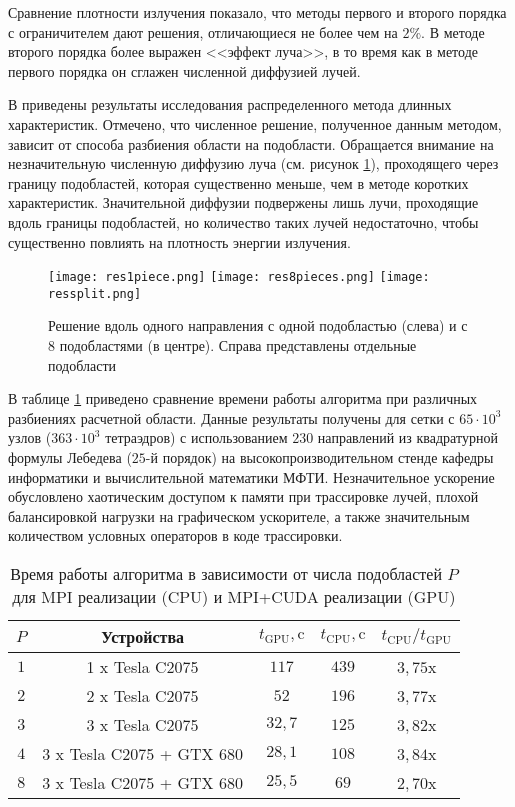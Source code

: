Сравнение плотности излучения показало, что методы первого и второго порядка с ограничителем дают решения, отличающиеся не более чем на $2\%$. В методе второго порядка более выражен <<эффект луча>>, в то время как в методе первого порядка он сглажен численной диффузией лучей.

В  приведены результаты исследования распределенного метода длинных характеристик. Отмечено, что численное решение, полученное данным методом, зависит от способа разбиения области на подобласти. Обращается внимание на незначительную численную диффузию луча (см. рисунок \ref{fig:1vs8}), проходящего через границу подобластей, которая существенно меньше, чем в методе коротких характеристик. Значительной диффузии подвержены лишь лучи, проходящие вдоль границы подобластей, но количество таких лучей недостаточно, чтобы существенно повлиять на плотность энергии излучения.
\begin{figure}[ht!]
\centering
\texttt{[image: res1piece.png]} %
\texttt{[image: res8pieces.png]} %
\texttt{[image: ressplit.png]} %
\caption{Решение вдоль одного направления с одной подобластью (слева) и с 8 подобластями (в центре). Справа представлены отдельные подобласти}
\label{fig:1vs8}
\end{figure}

В таблице \ref{tab:speedup} приведено сравнение времени работы алгоритма при
различных разбиениях расчетной области. Данные результаты получены для сетки с
$65 \cdot 10^3$ узлов ($363 \cdot 10^3$ тетраэдров) с использованием $230$ направлений
из квадратурной формулы Лебедева ($25$-й порядок) на высокопроизводительном стенде кафедры информатики и вычислительной математики МФТИ. Незначительное ускорение обусловлено хаотическим доступом к памяти при трассировке лучей, плохой балансировкой нагрузки на графическом ускорителе, а также значительным количеством условных операторов в коде трассировки.
\begin{table}[ht!]
\centering
    \begin{tabular}{|c|c|c|c|c|}
    \hline
    $P$ & Устройства & $t_\text{GPU}, \text{c}$ & $t_\text{CPU}, \text{c}$ & $t_\text{CPU} / t_\text{GPU}$\\\hline
    $1$& 1 x Tesla C2075 & $117$ & $439$ & $3,75$x\\\hline
    $2$& 2 x Tesla C2075 & $52$ & $196$ & $3,77$x\\\hline
    $3$& 3 x Tesla C2075 & $32,7$ & $125$ & $3,82$x\\\hline
    $4$& 3 x Tesla C2075 + GTX 680 & $28,1$ & $108$ & $3,84$x\\
	\hline
    $8$& 3 x Tesla C2075 + GTX 680 & $25,5$ & $69$ & $2,70$x\\\hline
    \end{tabular}
\caption{Время работы алгоритма в зависимости от числа подобластей $P$ для MPI реализации (CPU) и MPI+CUDA реализации (GPU)}
\label{tab:speedup}
\end{table}

